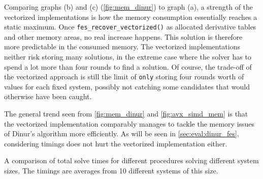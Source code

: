 Comparing graphs (b) and (c) (\cref{fig:mem_dinur}) to graph (a), a strength of the vectorized implementations is how the memory consumption essentially reaches a static maximum. Once \texttt{fes\_recover\_vectorized()} as allocated derivative tables and other memory areas, no real increase happens. This solution is therefore more predictable in the consumed memory. The vectorized implementations neither risk storing many solutions, in the extreme case where the solver has to spend a lot more than four rounds to find a solution. Of course, the trade-off of the vectorized approach is still the limit of \texttt{only} storing four rounds worth of values for each fixed system, possibly not catching some candidates that would otherwise have been caught.

The general trend seen from \cref{fig:mem_dinur} and \cref{fig:avx_simd_mem} is that the vectorized implementation comparably manages to tackle the memory issues of Dinur's algorithm more efficiently. As will be seen in \cref{sec:eval:dinur_fes}, considering timings does not hurt the vectorized implementation either.

\begin{table}[t]
    \begin{center}
    \end{center}
    \caption{A comparison of total solve times for different procedures solving different system sizes. The timings are averages from 10 different systems of this size.} \label{tbl:total_comp_perf}
\end{table}

